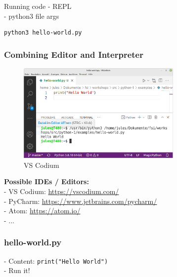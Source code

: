 \documentclass{beamer}
\begin{document}
\begin{frame}[fragile]
	\begin{block}{Running code}
		- REPL\\
		- python3 file args
	\end{block}
	\begin{example}
			\begin{verbatim}
python3 hello-world.py
		\end{verbatim}
	\end{example}
\end{frame}

\begin{frame}
	\frametitle{Combining Editor and Interpreter}
	\begin{figure}
		\includegraphics[width=8cm]{figures/vs-code.png}
		\caption{VS Codium}
	\end{figure}
\end{frame}
\begin{frame}
	\textbf{Possible IDEs / Editors:}\\
	- VS Codium: \url{https://vscodium.com/}\\
	- PyCharm: \url{https://www.jetbrains.com/pycharm/}\\
	- Atom: \url{https://atom.io/}\\
	- ...
\end{frame}

\begin{frame}[fragile]
	\frametitle{hello-world.py}
	- Content: \texttt{print("Hello World")}\\
	- Run it!
\end{frame}
\end{document}
